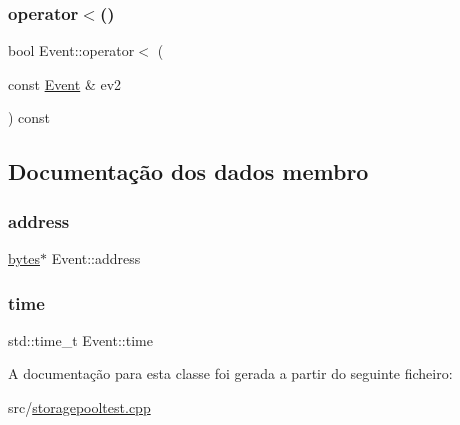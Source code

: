 \subsubsection{\texorpdfstring{operator$<$()}{operator<()}}
{\footnotesize\ttfamily bool Event\+::operator$<$ (\begin{DoxyParamCaption}\item[{const \hyperlink{classEvent}{Event} \&}]{ev2 }\end{DoxyParamCaption}) const\hspace{0.3cm}{\ttfamily [inline]}}



\subsection{Documentação dos dados membro}
\mbox{\label{classEvent_ab97f39d1ca773c8756d319bf8acad6f4}} 
\subsubsection{\texorpdfstring{address}{address}}
{\footnotesize\ttfamily \hyperlink{storagepooltest_8cpp_a9192c6634956b334d70312524e15a909}{bytes}$\ast$ Event\+::address}

\mbox{\label{classEvent_a3f96ab977c7b3b16edf59e8f96193ac0}} 
\subsubsection{\texorpdfstring{time}{time}}
{\footnotesize\ttfamily std\+::time\+\_\+t Event\+::time}



A documentação para esta classe foi gerada a partir do seguinte ficheiro\+:\begin{DoxyCompactItemize}
\item 
src/\hyperlink{storagepooltest_8cpp}{storagepooltest.\+cpp}\end{DoxyCompactItemize}
